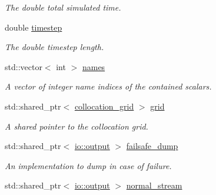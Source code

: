 \begin{DoxyCompactItemize}
\begin{DoxyCompactList}\small\item\em The double total simulated time. \end{DoxyCompactList}\item 
\hypertarget{classbases_1_1element_ac0bd283b49358bd1f5a0b6ec0e1daae0}{double \hyperlink{classbases_1_1element_ac0bd283b49358bd1f5a0b6ec0e1daae0}{timestep}}\label{classbases_1_1element_ac0bd283b49358bd1f5a0b6ec0e1daae0}

\begin{DoxyCompactList}\small\item\em The double timestep length. \end{DoxyCompactList}\item 
\hypertarget{classbases_1_1element_aa8c487033b765147186f5904cbfe39a6}{std\-::vector$<$ int $>$ \hyperlink{classbases_1_1element_aa8c487033b765147186f5904cbfe39a6}{names}}\label{classbases_1_1element_aa8c487033b765147186f5904cbfe39a6}

\begin{DoxyCompactList}\small\item\em A vector of integer name indices of the contained scalars. \end{DoxyCompactList}\item 
\hypertarget{classbases_1_1element_a0be44a6a3cef50bf30850759c9c1f433}{std\-::shared\-\_\-ptr$<$ \hyperlink{classbases_1_1collocation__grid}{collocation\-\_\-grid} $>$ \hyperlink{classbases_1_1element_a0be44a6a3cef50bf30850759c9c1f433}{grid}}\label{classbases_1_1element_a0be44a6a3cef50bf30850759c9c1f433}

\begin{DoxyCompactList}\small\item\em A shared pointer to the collocation grid. \end{DoxyCompactList}\item 
\hypertarget{classbases_1_1element_afe96a343a5fea6c7894a5a78bf460155}{std\-::shared\-\_\-ptr$<$ \hyperlink{classio_1_1output}{io\-::output} $>$ \hyperlink{classbases_1_1element_afe96a343a5fea6c7894a5a78bf460155}{failsafe\-\_\-dump}}\label{classbases_1_1element_afe96a343a5fea6c7894a5a78bf460155}

\begin{DoxyCompactList}\small\item\em An implementation to dump in case of failure. \end{DoxyCompactList}\item 
\hypertarget{classbases_1_1element_a876491b92ecc30b15971b72a04199262}{std\-::shared\-\_\-ptr$<$ \hyperlink{classio_1_1output}{io\-::output} $>$ \hyperlink{classbases_1_1element_a876491b92ecc30b15971b72a04199262}{normal\-\_\-stream}}\label{classbases_1_1element_a876491b92ecc30b15971b72a04199262}


\end{DoxyCompactItemize}

